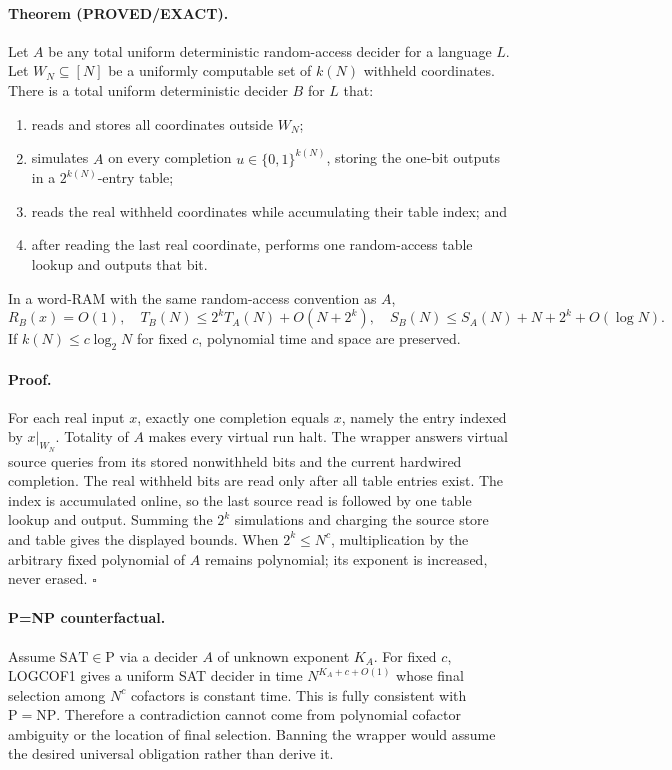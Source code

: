 \documentclass[11pt]{article}
\newcommand{\Status}[1]{\textbf{#1}}
\newcommand{\SAT}{\mathrm{SAT}}
\begin{document}
\paragraph{Theorem (\Status{PROVED/EXACT}).}
Let \(A\) be any total uniform deterministic random-access decider for a
language \(L\). Let \(W_N\subseteq[N]\) be a uniformly computable set of
\(k(N)\) withheld coordinates. There is a total uniform deterministic decider
\(B\) for \(L\) that:
\begin{enumerate}
 \item reads and stores all coordinates outside \(W_N\);
 \item simulates \(A\) on every completion \(u\in\{0,1\}^{k(N)}\), storing the
 one-bit outputs in a \(2^{k(N)}\)-entry table;
 \item reads the real withheld coordinates while accumulating their table
 index; and
 \item after reading the last real coordinate, performs one random-access
 table lookup and outputs that bit.
\end{enumerate}
In a word-RAM with the same random-access convention as \(A\),
\[
 R_B(x)=O(1),\quad
 T_B(N)\le 2^kT_A(N)+O(N+2^k),\quad
 S_B(N)\le S_A(N)+N+2^k+O(\log N).
\]
If \(k(N)\le c\log_2N\) for fixed \(c\), polynomial time and space are
preserved.

\paragraph{Proof.}
For each real input \(x\), exactly one completion equals \(x\), namely the
entry indexed by \(x|_{W_N}\). Totality of \(A\) makes every virtual run halt.
The wrapper answers virtual source queries from its stored nonwithheld bits and
the current hardwired completion. The real withheld bits are read only after
all table entries exist. The index is accumulated online, so the last source
read is followed by one table lookup and output. Summing the \(2^k\)
simulations and charging the source store and table gives the displayed bounds.
When \(2^k\le N^c\), multiplication by the arbitrary fixed polynomial of
\(A\) remains polynomial; its exponent is increased, never erased.
\(\square\)

\paragraph{P=NP counterfactual.}
Assume \(\SAT\in\mathrm P\) via a decider \(A\) of unknown exponent \(K_A\).
For fixed \(c\), LOGCOF1 gives a uniform SAT decider in time
\(N^{K_A+c+O(1)}\) whose final selection among \(N^c\) cofactors is constant
time. This is fully consistent with \(\mathrm P=\mathrm{NP}\). Therefore a
contradiction cannot come from polynomial cofactor ambiguity or the location
of final selection. Banning the wrapper would assume the desired universal
obligation rather than derive it.
\end{document}
